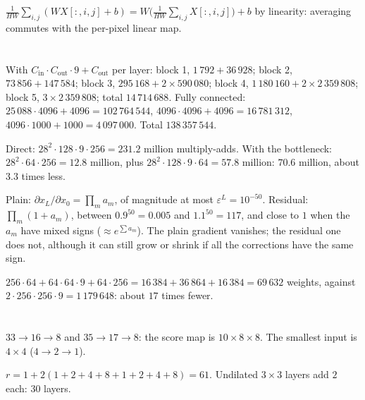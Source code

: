 $\frac1{HW}\sum_{i,j}(WX[:,i,j] + b) = W\bigl(\frac1{HW}\sum_{i,j}X[:,i,j]\bigr) + b$ by linearity: averaging commutes with the per-pixel linear map.

\section{}

With $C_{\mathrm{in}}\cdot C_{\mathrm{out}}\cdot9 + C_{\mathrm{out}}$ per layer: block 1, $1\,792 + 36\,928$; block 2, $73\,856 + 147\,584$; block 3, $295\,168 + 2\times590\,080$; block 4,
$1\,180\,160 + 2\times2\,359\,808$; block 5, $3\times2\,359\,808$; total $14\,714\,688$. Fully connected:
$25\,088\cdot4096 + 4096 = 102\,764\,544$, $4096\cdot4096 + 4096 = 16\,781\,312$, $4096\cdot1000 + 1000 = 4\,097\,000$. Total $138\,357\,544$.

Direct: $28^2\cdot128\cdot9\cdot256 = 231.2$ million multiply-adds. With the bottleneck: $28^2\cdot64\cdot256 = 12.8$ million, plus
$28^2\cdot128\cdot9\cdot64 = 57.8$ million: $70.6$ million, about $3.3$ times less.

Plain: $\partial x_L/\partial x_0 = \prod_ma_m$, of magnitude at most $\varepsilon^L = 10^{-50}$. Residual: $\prod_m(1 + a_m)$, between $0.9^{50} = 0.005$ and
$1.1^{50} = 117$, and close to $1$ when the $a_m$ have mixed signs ($\approx e^{\sum a_m}$). The plain gradient vanishes; the residual
one does not, although it can still grow or shrink if all the corrections have the same sign.

$256\cdot64 + 64\cdot64\cdot9 + 64\cdot256 = 16\,384 + 36\,864 + 16\,384 = 69\,632$ weights, against $2\cdot256\cdot256\cdot9 = 1\,179\,648$: about $17$ times
fewer.

\section{}

$33\to16\to8$ and $35\to17\to8$: the score map is $10\times8\times8$. The smallest input is $4\times4$ ($4\to2\to1$).

$r = 1 + 2(1 + 2 + 4 + 8 + 1 + 2 + 4 + 8) = 61$. Undilated $3\times3$ layers add $2$ each: $30$ layers.

